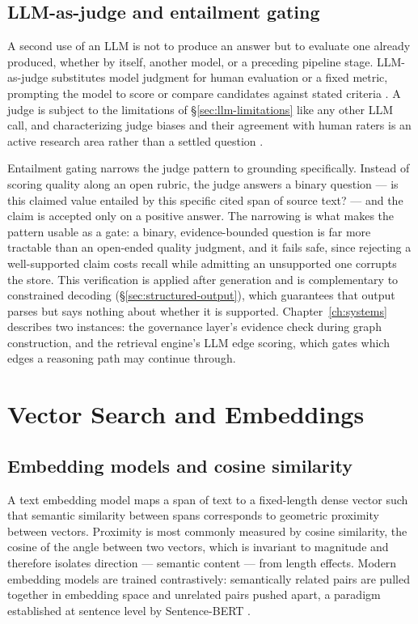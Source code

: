 \subsection{LLM-as-judge and entailment gating}
\label{sec:llm-as-judge}

A second use of an LLM is not to produce an answer but to evaluate one already produced, whether by itself, another model, or a preceding pipeline stage. LLM-as-judge substitutes model judgment for human evaluation or a fixed metric, prompting the model to score or compare candidates against stated criteria \citep{zheng2023judging}. A judge is subject to the limitations of \S\ref{sec:llm-limitations} like any other LLM call, and characterizing judge biases and their agreement with human raters is an active research area rather than a settled question \citep{gu2024survey}.

Entailment gating narrows the judge pattern to grounding specifically. Instead of scoring quality along an open rubric, the judge answers a binary question — is this claimed value entailed by this specific cited span of source text? — and the claim is accepted only on a positive answer. The narrowing is what makes the pattern usable as a gate: a binary, evidence-bounded question is far more tractable than an open-ended quality judgment, and it fails safe, since rejecting a well-supported claim costs recall while admitting an unsupported one corrupts the store. This verification is applied after generation and is complementary to constrained decoding (\S\ref{sec:structured-output}), which guarantees that output parses but says nothing about whether it is supported. Chapter~\ref{ch:systems} describes two instances: the governance layer's evidence check during graph construction, and the retrieval engine's LLM edge scoring, which gates which edges a reasoning path may continue through.

\section{Vector Search and Embeddings}
\label{sec:vector-search}

\subsection{Embedding models and cosine similarity}
\label{sec:embedding-models}

A text embedding model maps a span of text to a fixed-length dense vector such that semantic similarity between spans corresponds to geometric proximity between vectors. Proximity is most commonly measured by cosine similarity, the cosine of the angle between two vectors, which is invariant to magnitude and therefore isolates direction — semantic content — from length effects. Modern embedding models are trained contrastively: semantically related pairs are pulled together in embedding space and unrelated pairs pushed apart, a paradigm established at sentence level by Sentence-BERT \citep{reimers2019sentence}.

